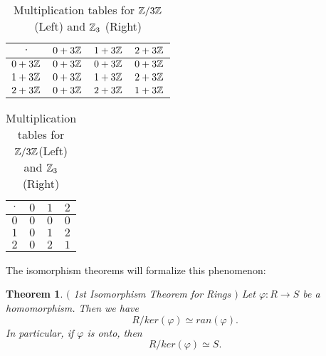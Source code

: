 \documentclass[12pt]{article}
\theoremstyle{plain}
\newtheorem{theorem}{Theorem}
\theoremstyle{definition}
\theoremstyle{remark}
\begin{document}
\begin{table}[H]
\qquad \quad \quad \quad
\begin{tabular}{ c| c | c | c}
$\cdot$  & $0+3\mathbb{Z}$ & $1+3\mathbb{Z}$ & $2+3\mathbb{Z}$ \\
\hline
$0+3\mathbb{Z}$ & $0+3\mathbb{Z}$ & $0+3\mathbb{Z}$ & $0+3\mathbb{Z}$  \\
\hline
$1+3\mathbb{Z}$ & $0+3\mathbb{Z}$ & $1+3\mathbb{Z}$ & $2+3\mathbb{Z}$  \\
\hline
$2+3\mathbb{Z}$ & $0+3\mathbb{Z}$ & $2+3\mathbb{Z}$ & $1+3\mathbb{Z}$ \\
\hline
\end{tabular}
\quad \quad \quad \quad \quad \quad \quad \quad \quad
\begin{tabular}{ c| c | c | c}
$\cdot$ & $0$ & $1$ & $2$ \\
\hline
$0$ & $0$ & $0$ & $0$  \\
\hline
$1$ & $0$ & $1$ & $2$  \\
\hline
$2$ & $0$ & $2$ & $1$ \\
\hline
\end{tabular}

\caption{Multiplication tables for $\mathbb{Z}/3\mathbb{Z}$(Left) and $\mathbb{Z}_3$ (Right)}
\end{table}

The isomorphism theorems will formalize this phenomenon:
\begin{theorem}$($ 1st Isomorphism Theorem for Rings $)$
Let $\varphi: R\rightarrow S$ be a homomorphism. Then we have
$$R/ker(\varphi) \simeq ran(\varphi).$$
In particular, if $\varphi$ is onto, then
$$R/ker(\varphi) \simeq S. $$
\end{theorem}
\end{document}
